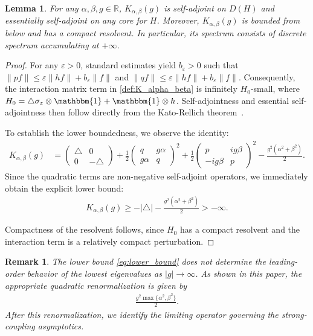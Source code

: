\documentclass[12pt,dvipdfmx]{article}
\newtheorem{lemma}[theorem]{Lemma}
\newtheorem{remark}[theorem]{Remark}
\newcommand{\eps}{\varepsilon}
\newcommand{\RR}{\mathbb{R}}
\newcommand{\one}{\mathbbm{1}}
\begin{document}
\begin{lemma}\label{lem:sa}
For any $\alpha, \beta, g \in \RR$, $K_{\alpha,\beta}(g)$ is self-adjoint on $D(H)$ and essentially self-adjoint on any core for $H$. Moreover, $K_{\alpha,\beta}(g)$ is bounded from below and has a compact resolvent. In particular, its spectrum consists of discrete spectrum accumulating at $+\infty$.
\end{lemma}

\begin{proof}
For any $\eps>0$, standard estimates  yield $b_\eps>0$ such that 
$\|pf\|\le\eps\|hf\|+b_\eps\|f\|$ and $\|qf\|\le\eps\|hf\|+b_\eps\|f\|$. Consequently, the interaction matrix term in \eqref{def:K_alpha_beta} is infinitely $H_0$-small, where $H_0=\triangle\sigma_z\otimes\one+\one\otimes h$. Self-adjointness and essential self-adjointness then follow directly from the Kato-Rellich theorem~\cite{Kato51}. 

To establish the lower boundedness, we observe the identity:
\begin{align*}
    K_{\alpha, \beta}(g) 
    &= 
    \begin{pmatrix} \triangle & 0\\ 0 & -\triangle \end{pmatrix}
    + 
    \frac12 \begin{pmatrix} q & g\alpha\\ g\alpha & q \end{pmatrix}^2
    + 
    \frac12 \begin{pmatrix} p & ig\beta\\ -ig\beta & p \end{pmatrix}^2
    - 
    \frac{g^2 (\alpha^2 + \beta^2)}{2}.
\end{align*}
Since the quadratic terms are non-negative self-adjoint operators, we immediately obtain the explicit lower bound:
\begin{align}\label{eq:lower_bound}
    K_{\alpha,\beta}(g) 
    \ge 
    -|\triangle| - \frac{g^2 (\alpha^2 + \beta^2)}{2} 
    > -\infty.
\end{align}

Compactness of the resolvent follows, since $H_0$ has a compact resolvent and the interaction term is a relatively compact perturbation.
\end{proof}
%
\begin{remark}\label{rem:renormalization}
The lower bound \eqref{eq:lower_bound}  does not determine the leading-order behavior of the lowest eigenvalues as $|g|\to\infty$. As shown in this paper, the appropriate quadratic renormalization is
given by 
\begin{align*}
    \frac{g^2 \max\{\alpha^2,\beta^2\}}{2}. 
\end{align*}
After this renormalization, we identify the limiting operator governing the strong-coupling asymptotics.
\end{remark}
\end{document}
